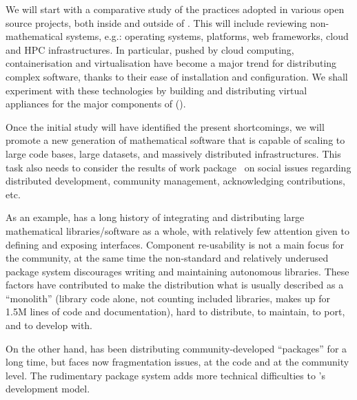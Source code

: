 \begin{workpackage}[id=component-architecture,wphases=0-48!.5,
  title=Component Architecture,lead=UV,
  PSRM=46,UVRM=8,SARM=16, USORM=6, UORM=19, LLRM=14, UJFRM=6, UGRM=14]
\begin{tasklist}
\begin{task}[title=Modularisation and packaging,id=mod-packaging,lead=UV,PM=28,partners={PS,LL,UG,UO},wphases=0-48,issue=52]
    We will start with a comparative study of the practices adopted in
    various open source projects, both inside and outside of
    \TheProject. This will include reviewing non-mathematical systems,
    e.g.: operating systems, platforms, web frameworks, cloud and HPC
    infrastructures.  In particular, pushed by cloud computing,
    containerisation \cite{Docker} and virtualisation
    \cite{Virtualbox} have become a major trend for distributing
    complex software, thanks to their ease of installation and
    configuration. We shall experiment with these technologies by
    building and distributing virtual appliances for the major
    components of \TheProject
    ().

    Once the initial study will have identified the present
    shortcomings, we will promote a new generation of mathematical
    software that is capable of scaling to large code bases, large
    datasets, and massively distributed infrastructures. This task
    also needs to consider the results of work
    package~ on social issues regarding
    distributed development, community management, acknowledging
    contributions, etc.

    As an example, \Sage has a long history of integrating and
    distributing large mathematical libraries/software as a whole,
    with relatively few attention given to defining and exposing
    interfaces. Component re-usability is not a main focus for the
    \Sage community, at the same time the non-standard and relatively
    underused package system discourages writing and maintaining
    autonomous libraries. These factors have contributed to make the
    \Sage distribution what is usually described as a ``monolith''
    (\Sage library code alone, not counting included libraries, makes
    up for 1.5M lines of code and documentation), hard to distribute,
    to maintain, to port, and to develop with.

    On the other hand, \GAP has been distributing
    community-developed ``\GAP packages'' for a long time, but faces
    now fragmentation issues, at the code and at the community
    level. The rudimentary package system adds more technical
    difficulties to \GAP's development model.


\end{task}
\end{tasklist}
\end{workpackage}
